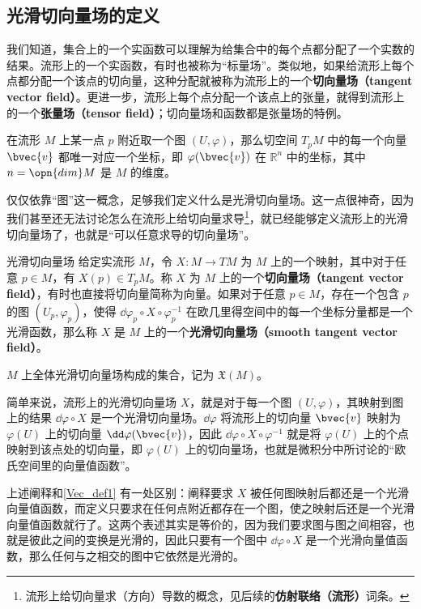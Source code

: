 
\subsection{光滑切向量场的定义}

我们知道，集合上的一个实函数可以理解为给集合中的每个点都分配了一个实数的结果。流形上的一个实函数，有时也被称为“标量场”。类似地，如果给流形上每个点都分配一个该点的切向量，这种分配就被称为流形上的一个\textbf{切向量场（tangent vector field）}。更进一步，流形上每个点分配一个该点上的张量，就得到流形上的一个\textbf{张量场（tensor field）}；切向量场和函数都是张量场的特例。


在流形 $M$ 上某一点 $p$ 附近取一个图 $(U, \varphi)$，那么切空间 $T_pM$ 中的每一个向量 $\bvec{v}$ 都唯一对应一个坐标，即 $\varphi(\bvec{v})$ 在 $\mathbb{R}^n$ 中的坐标，其中 $n=\opn{dim}M$ 是 $M$ 的维度。

仅仅依靠“图”这一概念，足够我们定义什么是光滑切向量场。这一点很神奇，因为我们甚至还无法讨论怎么在流形上给切向量求导\footnote{流形上给切向量求（方向）导数的概念，见后续的\textbf{仿射联络（流形）}词条。}，就已经能够定义流形上的光滑切向量场了，也就是“可以任意求导的切向量场”。

\begin{definition}{光滑切向量场}\label{Vec_def1}
给定实流形 $M$，令 $X:M\to TM$ 为 $M$ 上的一个映射，其中对于任意 $p\in M$，有 $X(p)\in T_pM$。称 $X$ 为 $M$ 上的一个\textbf{切向量场（tangent vector field）}，有时也直接将切向量简称为向量。如果对于任意 $p\in M$，存在一个包含 $p$ 的图 $(U_p, \varphi_p)$，使得 $\dd\varphi_p\circ X\circ\varphi_p^{-1}$ 在欧几里得空间中的每一个坐标分量都是一个光滑函数，那么称 $X$ 是 $M$ 上的一个\textbf{光滑切向量场（smooth tangent vector field）}。

$M$ 上全体光滑切向量场构成的集合，记为 $\mathfrak{X}(M)$。
\end{definition}

简单来说，流形上的光滑切向量场 $X$，就是对于每一个图 $(U, \varphi)$，其映射到图上的结果 $\dd\varphi\circ X$ 是一个光滑切向量场。$\dd\varphi$ 将流形上的切向量 $\bvec{v}$ 映射为 $\varphi(U)$ 上的切向量 $\dd\varphi(\bvec{v})$，因此 $\dd\varphi\circ X\circ\varphi^{-1}$ 就是将 $\varphi(U)$ 上的个点映射到该点处的切向量，即 $\varphi(U)$ 上的切向量场，也就是微积分中所讨论的“欧氏空间里的向量值函数”。

上述阐释和\autoref{Vec_def1} 有一处区别：阐释要求 $X$ 被任何图映射后都还是一个光滑向量值函数，而定义只要求在任何点附近都存在一个图，使之映射后还是一个光滑向量值函数就行了。这两个表述其实是等价的，因为我们要求图与图之间相容，也就是彼此之间的变换是光滑的，因此只要有一个图中 $\dd\varphi\circ X$ 是一个光滑向量值函数，那么任何与之相交的图中它依然是光滑的。

